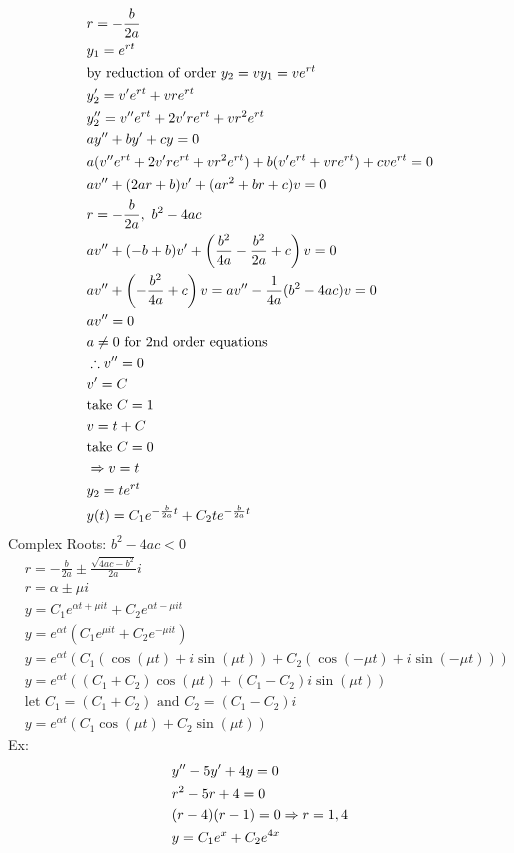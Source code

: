 \documentclass[11pt, fleqn]{article}
\begin{document}
\begin{align*}
    &r=-\frac{b}{2a}\\
    &y_1=e^{rt}\\
    &\text{by reduction of order }y_2=vy_1=ve^{rt}\\
    &y_2'=v'e^{rt}+vre^{rt}\\
    &y_2''=v''e^{rt}+2v're^{rt}+vr^2e^{rt}\\
    &ay''+by'+cy=0\\
    &a(v''e^{rt}+2v're^{rt}+vr^2e^{rt})+b(v'e^{rt}+vre^{rt})+cve^{rt}=0\\
    &av''+(2ar+b)v'+(ar^2+br+c)v=0\\
    &r=-\frac{b}{2a},\ b^2-4ac\\
    &av''+(-b+b)v'+\left( \frac{b^2}{4a}-\frac{b^2}{2a}+c \right)v=0\\
    &av''+\left( -\frac{b^2}{4a}+c \right)v=av''-\frac{1}{4a}(b^2-4ac)v=0\\
    &av''=0\\
    &a\neq0\text{ for 2nd order equations}\\
    &\therefore v''=0\\
    &v'=C\\
    &\text{take }C=1\\
    &v=t+C\\
    &\text{take }C=0\\
    &\Rightarrow v=t\\
    &y_2=te^{rt}\\
    &y(t)=C_1e^{-\frac{b}{2a}t}+C_2te^{-\frac{b}{2a}t}
\end{align*}
Complex Roots: $b^2-4ac<0$
\begin{align*}
    &r=-\frac{b}{2a}\pm\frac{\sqrt{4ac-b^2}}{2a}i\\
    &r=\alpha\pm\mu i\\
    &y=C_1e^{\alpha t+\mu it}+C_2e^{\alpha t-\mu it}\\
    &y=e^{\alpha t}(C_1e^{\mu it}+C_2e^{-\mu it})\\
    &y=e^{\alpha t}(C_1(\cos(\mu t)+i\sin(\mu t))+C_2(\cos(-\mu t)+i\sin(-\mu t)))\\
    &y=e^{\alpha t}((C_1+C_2)\cos(\mu t)+(C_1-C_2)i\sin(\mu t))\\
    &\text{let }C_1=(C_1+C_2)\text{ and }C_2=(C_1-C_2)i\\
    &y=e^{\alpha t}(C_1\cos(\mu t)+C_2\sin(\mu t))
\end{align*}
Ex:
\begin{align*}
    &y''-5y'+4y=0\\
    &r^2-5r+4=0\\
    &(r-4)(r-1)=0\Rightarrow r=1,4\\
    &y=C_1e^{x}+C_2e^{4x}
\end{align*}
\end{document}
